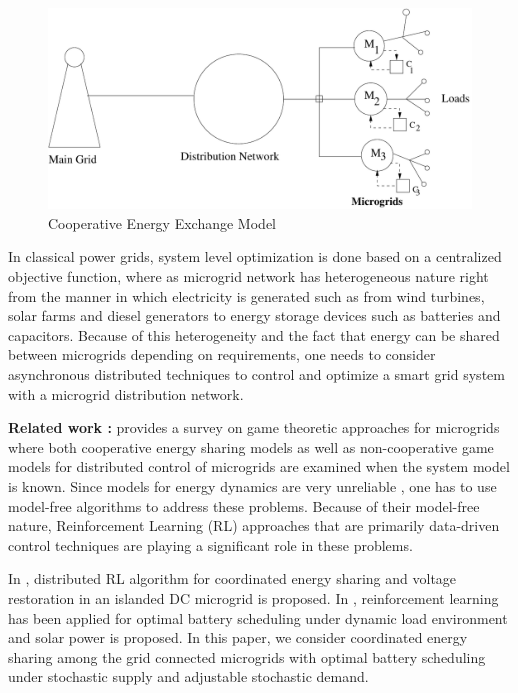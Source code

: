 \begin{figure}[thpb]
      \centering
      \includegraphics[scale=0.4]{powergrid2.pdf}
      \caption{Cooperative Energy Exchange Model}
      \label{gridmodel}
\end{figure}

In classical power grids, system level optimization is done based on a centralized
objective function, where as 
microgrid network has heterogeneous nature right from the manner in which electricity
is generated such as from wind turbines, solar farms and diesel generators
to energy storage devices such as batteries and capacitors.
 Because of this heterogeneity and the fact that energy can be shared between microgrids depending
on requirements, one needs to consider asynchronous distributed techniques 
 to control and optimize a smart grid system
with a microgrid distribution network.

\textbf{Related work :} \cite{saad2012game} provides a survey on game theoretic approaches for microgrids where both cooperative energy sharing models as well as non-cooperative game models for distributed control of microgrids are examined when the system model is known. Since  models for energy dynamics are very unreliable \cite{zamora2010controls}, one has to use model-free algorithms to address these problems.  Because of their model-free nature, Reinforcement Learning (RL) \cite{sutton1998reinforcement} approaches that are primarily data-driven control techniques are playing a significant role in these problems.

In \cite{zifadistributed}, distributed RL algorithm for coordinated energy sharing and voltage restoration in an islanded DC microgrid is proposed. In \cite{leo2014reinforcement}, reinforcement learning has been applied for optimal battery scheduling under  dynamic load environment and solar power is proposed. In this paper, we  consider coordinated energy sharing among the grid connected microgrids with optimal battery scheduling under stochastic supply and adjustable stochastic demand.

